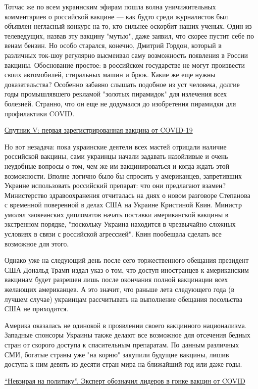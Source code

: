 Тотчас же по всем украинским эфирам пошла волна уничижительных комментариев о
российской вакцине — как будто среди журналистов был объявлен негласный конкурс
на то, кто сильнее оскорбит наших ученых. Один из телеведущих, назвав эту
вакцину "мутью", даже заявил, что скорее пустит себе по венам бензин. Но особо
старался, конечно, Дмитрий Гордон, который в различных ток-шоу регулярно
высмеивал саму возможность появления в России вакцины. Обоснование простое: в
российском государстве не могут произвести своих автомобилей, стиральных машин
и брюк. Какие же еще нужны доказательства? Особенно забавно слышать подобное из
уст человека, долгие годы промышлявшего рекламой "золотых пирамидок" для
излечения всех болезней. Странно, что он еще не додумался до изобретения
пирамидки для профилактики COVID.

\href{https://ria.ru/20200812/1575689573.html?in=t}{Спутник V: первая зарегистрированная вакцина от COVID-19}

Но вот незадача: пока украинские деятели всех мастей отрицали наличие
российской вакцины, сами украинцы начали задавать назойливые и очень неудобные
вопросы о том, чем же им вакцинироваться и когда ждать этой возможности. Вполне
логично было бы спросить у американцев, запретивших Украине использовать
российский препарат: что они предлагают взамен? Министерство здравоохранения
отчиталась на днях о новом разговоре Степанова с временной поверенной в делах
США на Украине Кристиной Квин. Министр умолял заокеанских дипломатов начать
поставки американской вакцины в экстренном порядке, "поскольку Украина
находится в чрезвычайно сложных условиях в связи с российской агрессией". Квин
пообещала сделать все возможное для этого.

Однако уже на следующий день после сего торжественного обещания президент США
Дональд Трамп издал указ о том, что доступ иностранцев к американским вакцинам
будет разрешен лишь после окончания полной вакцинации всех желающих
американцев. А это значит, что раньше лета следующего года (в лучшем случае)
украинцам рассчитывать на выполнение обещания посольства США не приходится.

Америка оказалась не одинокой в проявлении своего вакцинного национализма.
Западные спонсоры Украины также делают все возможное для отсечения бедных стран
от скорого доступа к спасительным препаратам. По данным различных СМИ, богатые
страны уже "на корню" закупили будущие вакцины, лишив доступа к ним девять из
десяти стран мира на ближайший год или даже годы.

\href{https://radiosputnik.ria.ru/20201213/koronavirus-1588976058.html?in=t}{\enquote{Невзирая на политику}. Эксперт обозначил лидеров в гонке вакцин от COVID}


